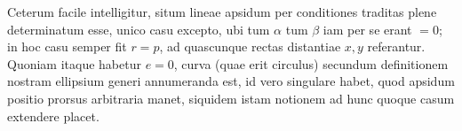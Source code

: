 Ceterum facile intelligitur, situm lineae apsidum per conditiones traditas plene determinatum esse, unico casu excepto, ubi tum $\alpha$ tum $\beta$ iam per se erant $=0$; in hoc casu semper fit $r=p$, ad quascunque rectas distantiae $x, y$ referantur. Quoniam itaque habetur $e=0$, curva (quae erit circulus) secundum definitionem nostram ellipsium generi annumeranda est, id vero singulare habet, quod apsidum positio prorsus arbitraria manet, siquidem istam notionem ad hunc quoque casum extendere placet.
